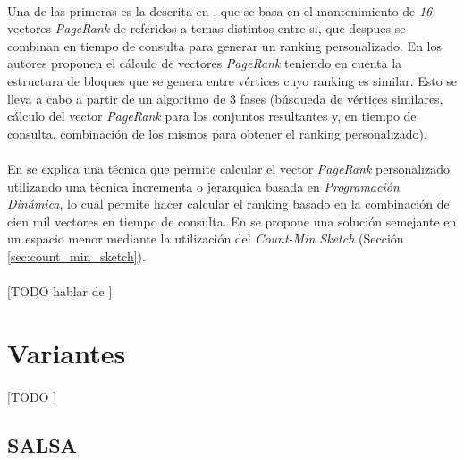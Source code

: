 \documentclass{subfiles}
\begin{document}
      \paragraph{}
      Una de las primeras es la descrita en \cite{haveliwala2002topic}, que se basa en el mantenimiento de \emph{16} vectores \emph{PageRank} de referidos a temas distintos entre si, que despues se combinan en tiempo de consulta para generar un ranking personalizado. En \cite{kamvar2003exploiting} los autores proponen el cálculo de vectores \emph{PageRank} teniendo en cuenta la estructura de bloques que se genera entre vértices cuyo ranking es similar. Esto se lleva a cabo a partir de un algoritmo de 3 fases (búsqueda de vértices similares, cálculo del vector \emph{PageRank} para los conjuntos resultantes y, en tiempo de consulta, combinación de los mismos para obtener el ranking personalizado).

      \paragraph{}
      En \cite{jeh2003scaling} se explica una técnica que permite calcular el vector \emph{PageRank} personalizado utilizando una técnica incrementa o jerarquica basada en \emph{Programación Dinámica}, lo cual permite hacer calcular el ranking basado en la combinación de cien mil vectores en tiempo de consulta. En \cite{sarlos2006randomize} se propone una solución semejante en un espacio menor mediante la utilización del \emph{Count-Min Sketch} (Sección \ref{sec:count_min_sketch}).

      \paragraph{}
      [TODO hablar de \cite{sarma2011estimating}]

    \section{Variantes}
    \label{sec:pagerank_variants}

      \paragraph{}
      [TODO ]

      \subsection{SALSA}
      \label{sec:salsa}
\end{document}
